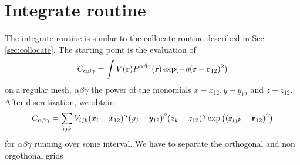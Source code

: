 \documentclass[prb]{revtex4}
\begin{document}
\section{Integrate routine}

The integrate routine is similar to the collocate routine described in
Sec.\ref{sec:collocate}. The starting point is the evaluation of
\begin{equation}
  \label{eq:integrate:0}
  C_{\alpha\beta\gamma} = \int V({\bf r}) P^{\alpha\beta\gamma}({\bf r}) \exp(- \eta ({\bf r} - {\bf r}_{12})^2)
\end{equation}
on a regular mesh, $\alpha\beta\gamma$ the power of the monomials $x-x_{12}, y -
y_{12}$ and $z-z_{12}$. After discretization, we obtain
\begin{equation}
  \label{eq:integration:1}
  C_{\alpha\beta\gamma} = \sum_{ijk} V_{ijk} (x_i -x_{12})^\alpha (y_j -y_{12})^\beta (z_k - z_{12})^\gamma \exp\left(({\bf r}_{ijk} - {\bf r}_{12})^2\right)
\end{equation}
for $\alpha\beta\gamma$ running over some interval. We have to separate the
orthogonal and non orgothonal grids
\end{document}
